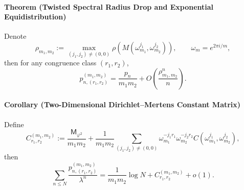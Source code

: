 \paragraph{Theorem (Twisted Spectral Radius Drop and Exponential Equidistribution)}
Denote
\[
\rho_{m_1,m_2}:=\max_{(j_1,j_2)\neq(0,0)}\rho\!\left(M(\omega_{m_1}^{j_1},\omega_{m_2}^{j_2})\right),
\qquad \omega_m=e^{2\pi i/m},
\]
then for any congruence class $(r_1,r_2)$,
\[
p_{n,(r_1,r_2)}^{(m_1,m_2)}=\frac{p_n}{m_1m_2}+O\!\left(\frac{\rho_{m_1,m_2}^n}{n}\right).
\]

\paragraph{Corollary (Two-Dimensional Dirichlet--Mertens Constant Matrix)}
Define
\[
C_{r_1,r_2}^{(m_1,m_2)}:=\frac{\mathsf{M}_{\varphi^2}}{m_1m_2}
+\frac{1}{m_1m_2}\sum_{(j_1,j_2)\neq(0,0)}\omega_{m_1}^{-j_1r_1}\omega_{m_2}^{-j_2r_2}
C(\omega_{m_1}^{j_1},\omega_{m_2}^{j_2}),
\]
then
\[
\sum_{n\le N}\frac{p_{n,(r_1,r_2)}^{(m_1,m_2)}}{\lambda^n}
=\frac{1}{m_1m_2}\log N+C_{r_1,r_2}^{(m_1,m_2)}+o(1).
\]

